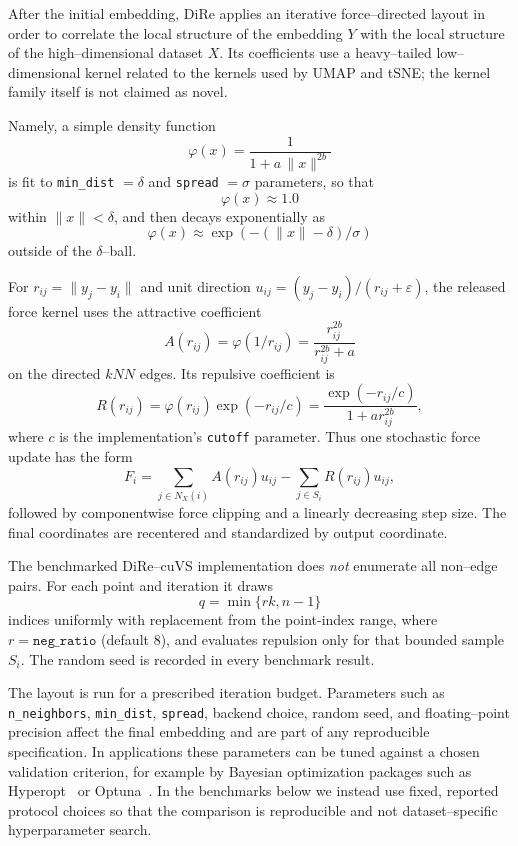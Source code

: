 \documentclass[11pt]{article}
\begin{document}
After the initial embedding, DiRe applies an iterative force--directed layout in
order to correlate the local structure of the embedding $Y$ with the local
structure of the high--dimensional dataset $X$. Its coefficients use a
heavy--tailed low--dimensional kernel related to the kernels used by UMAP and
tSNE; the kernel family itself is not claimed as novel.

Namely, a simple density function 
\[\varphi(x) = \frac{1}{1 + a\, \|x\|^{2b}}\]
is fit to \texttt{min\_dist} $=\delta$ and \texttt{spread} $=\sigma$ parameters, so that 
\[\varphi(x) \approx 1.0\]
within $\|x\| < \delta$, and then decays exponentially as
\[\varphi(x) \approx \exp( - (\|x\| - \delta)/\sigma )\]
outside of the $\delta$--ball. 

For $r_{ij}=\|y_j-y_i\|$ and unit direction
$u_{ij}=(y_j-y_i)/(r_{ij}+\varepsilon)$, the released force kernel uses the
attractive coefficient
\[
A(r_{ij})=\varphi(1/r_{ij})
          =\frac{r_{ij}^{2b}}{r_{ij}^{2b}+a}
\]
on the directed $kNN$ edges. Its repulsive coefficient is
\[
R(r_{ij})=\varphi(r_{ij})\exp(-r_{ij}/c)
          =\frac{\exp(-r_{ij}/c)}{1+a r_{ij}^{2b}},
\]
where $c$ is the implementation's \texttt{cutoff} parameter. Thus one
stochastic force update has the form
\[
F_i=\sum_{j\in N_X(i)} A(r_{ij})u_{ij}
    -\sum_{j\in S_i} R(r_{ij})u_{ij},
\]
followed by componentwise force clipping and a linearly decreasing step size.
The final coordinates are recentered and standardized by output coordinate.

The benchmarked DiRe--cuVS implementation does \emph{not} enumerate all
non--edge pairs. For each point and iteration it draws
\[
q = \min\{r k,n-1\}
\]
indices uniformly with replacement from the point-index range, where
$r=\texttt{neg\_ratio}$ (default $8$), and evaluates repulsion only for that
bounded sample $S_i$. The random seed is recorded in every benchmark result.

The layout is run for a prescribed iteration budget. Parameters such as \texttt{n\_neighbors}, \texttt{min\_dist}, \texttt{spread}, backend choice, random seed, and floating--point precision affect the final embedding and are part of any reproducible specification. In applications these parameters can be tuned against a chosen validation criterion, for example by Bayesian optimization packages such as Hyperopt~\cite{hyperopt} or Optuna~\cite{optuna}. In the benchmarks below we instead use fixed, reported protocol choices so that the comparison is reproducible and not dataset--specific hyperparameter search.
\end{document}
